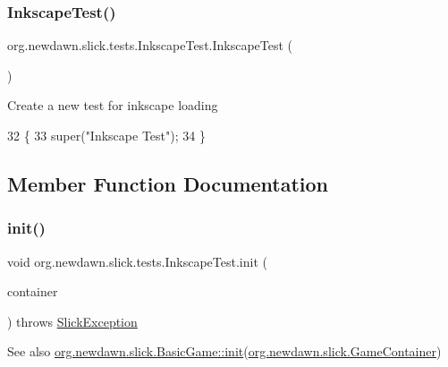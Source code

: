 \subsubsection{\texorpdfstring{Inkscape\+Test()}{InkscapeTest()}}
{\footnotesize\ttfamily org.\+newdawn.\+slick.\+tests.\+Inkscape\+Test.\+Inkscape\+Test (\begin{DoxyParamCaption}{ }\end{DoxyParamCaption})\hspace{0.3cm}{\ttfamily [inline]}}

Create a new test for inkscape loading 
\begin{DoxyCode}
32                           \{
33         super(\textcolor{stringliteral}{"Inkscape Test"});
34     \}
\end{DoxyCode}


\subsection{Member Function Documentation}
\mbox{\label{classorg_1_1newdawn_1_1slick_1_1tests_1_1_inkscape_test_a8a36fbd071d89a6d399673e246fe9409}} 
\subsubsection{\texorpdfstring{init()}{init()}}
{\footnotesize\ttfamily void org.\+newdawn.\+slick.\+tests.\+Inkscape\+Test.\+init (\begin{DoxyParamCaption}\item[{\mbox{\hyperlink{classorg_1_1newdawn_1_1slick_1_1_game_container}{Game\+Container}}}]{container }\end{DoxyParamCaption}) throws \mbox{\hyperlink{classorg_1_1newdawn_1_1slick_1_1_slick_exception}{Slick\+Exception}}\hspace{0.3cm}{\ttfamily [inline]}}

\begin{DoxySeeAlso}{See also}
\mbox{\hyperlink{classorg_1_1newdawn_1_1slick_1_1_basic_game_a8af0900217e4d389249f71367b22d114}{org.\+newdawn.\+slick.\+Basic\+Game\+::init}}(\mbox{\hyperlink{classorg_1_1newdawn_1_1slick_1_1_game_container}{org.\+newdawn.\+slick.\+Game\+Container}}) 
\end{DoxySeeAlso}


